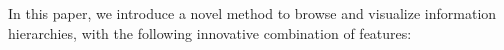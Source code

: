 \documentclass[]{article}
\begin{document}



In this paper, we introduce a novel method to browse and visualize information hierarchies, with the following innovative combination of features:
\end{document}
